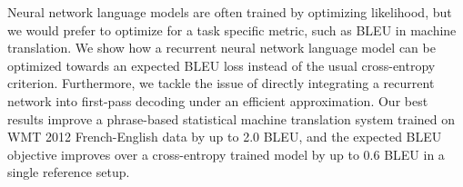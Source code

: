 Neural network language models are often trained by optimizing likelihood, but we would prefer to optimize for a task specific metric, such as BLEU in machine translation. We show how a recurrent neural network language model can be optimized towards an expected BLEU loss instead of the usual cross-entropy criterion. Furthermore, we tackle the issue of directly integrating a recurrent network into first-pass decoding under an efficient approximation. Our best results improve a phrase-based statistical machine translation system trained on WMT 2012 French-English data by up to 2.0 BLEU, and the expected BLEU objective improves over a cross-entropy trained model by up to 0.6 BLEU in a single reference setup.
